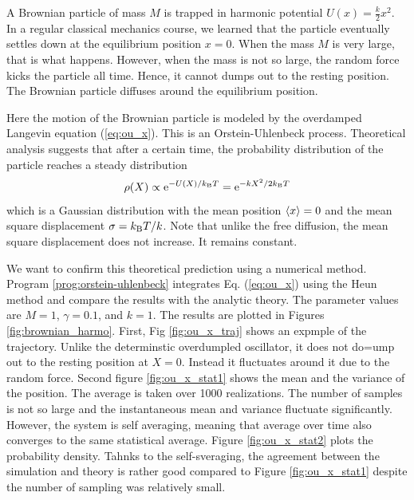 \begin{example}\label{ex:ou_x}

A Brownian particle of mass $M$ is trapped in harmonic potential $U(x) = \displaystyle\frac{k}{2} x^2$. In a regular classical mechanics course, we learned that the particle eventually settles down at the equilibrium position $x=0$.  When the mass $M$ is very large, that is what happens.   However, when the mass is not so large, the random force kicks the particle all time.  Hence, it cannot dumps out to the resting position. The Brownian particle diffuses around the equilibrium position.

Here the motion of the Brownian particle is modeled by the overdamped Langevin equation (\ref{eq:ou_x}).  This is an Orstein-Uhlenbeck process.
Theoretical analysis suggests that after a certain time, the probability distribution of the particle reaches a steady distribution
\begin{equation}
\rho(X) \propto \text{e}^{-U(X)/k_\text{B} T} = \text{e}^{-k X^2/2 k_\text{B} T}
\end{equation}
which is a Gaussian distribution with the mean position $\langle x \rangle=0$ and the mean square displacement $\sigma = k_\text{B} T/k$.  Note that unlike the free diffusion, the mean square displacement does not increase.  It remains constant.

We want to confirm this theoretical prediction using a numerical method.
Program \ref{prog:orstein-uhlenbeck} integrates Eq. (\ref{eq:ou_x}) using the Heun method and compare the results with the analytic theory. The parameter values are $M=1$, $\gamma=0.1$, and $k=1$.  The results are plotted in Figures \ref{fig:brownian_harmo}.  First, Fig \ref{fig:ou_x_traj} shows an expmple of the trajectory. Unlike the determinstic overdumpled oscillator, it does not do=ump out to the resting position at $X=0$.  Instead it fluctuates around it due to the random force. Second figure \ref{fig:ou_x_stat1} shows the mean and the variance of the position.  The average is taken over 1000 realizations.  The number of samples is not so large and the instantaneous mean and variance fluctuate significantly.  However, the system is self averaging, meaning that average over time also converges to the same statistical average.  Figure \ref{fig:ou_x_stat2} plots the probability density.  Tahnks to the self-sveraging, the agreement between the simulation and theory is rather good compared to Figure \ref{fig:ou_x_stat1} despite the number of sampling was relatively small.



\end{example}

